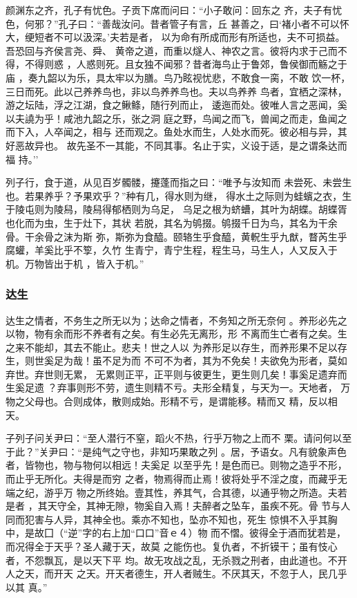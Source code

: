 \documentclass[]{article}
\begin{document}
颜渊东之齐，孔子有忧色。子贡下席而问曰：``小子敢问：回东之
齐，夫子有忧色，何邪？''孔子曰：``善哉汝问。昔者管子有言，丘
甚善之，曰`褚小者不可以怀大，绠短者不可以汲深。'夫若是者，
以为命有所成而形有所适也，夫不可损益。吾恐回与齐侯言尧、舜、
黄帝之道，而重以燧人、神农之言。彼将内求于己而不得，不得则惑
，人惑则死。且女独不闻邪？昔者海鸟止于鲁郊，鲁侯御而觞之于庙
，奏九韶以为乐，具太牢以为膳。鸟乃眩视忧悲，不敢食一脔，不敢
饮一杯，三日而死。此以己养养鸟也，非以鸟养养鸟也。夫以鸟养养
鸟者，宜栖之深林，游之坛陆，浮之江湖，食之鳅鲦，随行列而止，
逶迤而处。彼唯人言之恶闻，奚以夫譊为乎！咸池九韶之乐，张之洞
庭之野，鸟闻之而飞，兽闻之而走，鱼闻之而下入，人卒闻之，相与
还而观之。鱼处水而生，人处水而死。彼必相与异，其好恶故异也。
故先圣不一其能，不同其事。名止于实，义设于适，是之谓条达而福 持。''

列子行，食于道，从见百岁髑髅，攓蓬而指之曰：``唯予与汝知而
未尝死、未尝生也。若果养乎？予果欢乎？''种有几，得水则为继，
得水土之际则为蛙蠙之衣，生于陵屯则为陵舄，陵舄得郁栖则为乌足，
乌足之根为蛴螬，其叶为胡蝶。胡蝶胥也化而为虫，生于灶下，其状
若脱，其名为鸲掇。鸲掇千日为鸟，其名为干余骨。干余骨之沫为斯
弥，斯弥为食醯。颐辂生乎食醯，黄軦生乎九猷，瞀芮生乎腐蠸，羊奚比乎不箰，久竹
生青宁，青宁生程，程生马，马生人，人又反入于机。万物皆出于机
，皆入于机。''

\hypertarget{header-n2223}{%
\subsubsection{达生}\label{header-n2223}}

达生之情者，不务生之所无以为；达命之情者，不务知之所无奈何
。养形必先之以物，物有余而形不养者有之矣。有生必先无离形，形
不离而生亡者有之矣。生之来不能却，其去不能止。悲夫！世之人以
为养形足以存生，而养形果不足以存生，则世奚足为哉！虽不足为而
不可不为者，其为不免矣！夫欲免为形者，莫如弃世。弃世则无累，
无累则正平，正平则与彼更生，更生则几矣！事奚足遗弃而生奚足遗
？弃事则形不劳，遗生则精不亏。夫形全精复，与天为一。天地者，
万物之父母也。合则成体，散则成始。形精不亏，是谓能移。精而又
精，反以相天。

子列子问关尹曰：``至人潜行不窒，蹈火不热，行乎万物之上而不
栗。请问何以至于此？''关尹曰：``是纯气之守也，非知巧果敢之列
。居，予语女。凡有貌象声色者，皆物也，物与物何以相远！夫奚足
以至乎先！是色而已。则物之造乎不形，而止乎无所化。夫得是而穷
之者，物焉得而止焉！彼将处乎不淫之度，而藏乎无端之纪，游乎万
物之所终始。壹其性，养其气，合其德，以通乎物之所造。夫若是者
，其天守全，其神无隙，物奚自入焉！夫醉者之坠车，虽疾不死。骨
节与人同而犯害与人异，其神全也。乘亦不知也，坠亦不知也，死生
惊惧不入乎其胸中，是故囗（``逆''字的右上加``口口''音ｅ４）物
而不慴。彼得全于酒而犹若是，而况得全于天乎？圣人藏于天，故莫
之能伤也。复仇者，不折镆干；虽有忮心者，不怨飘瓦，是以天下平
均。故无攻战之乱，无杀戮之刑者，由此道也。不开人之天，而开天
之天。开天者德生，开人者贼生。不厌其天，不忽于人，民几乎以其 真。''
\end{document}
